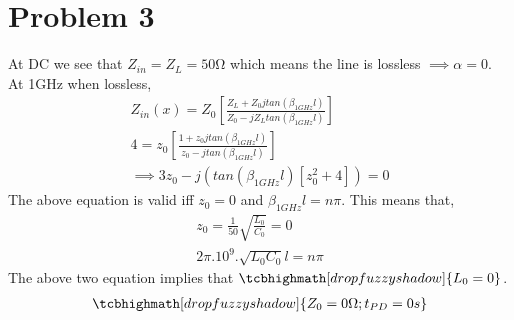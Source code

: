 \documentclass{article}
\begin{document}
\section*{\hfil Problem 3}
At DC we see that $Z_{in} = Z_L = 50 \si{\ohm}$ which means the line is lossless $\implies \alpha = 0$.\\
At 1GHz when lossless,
\begin{gather}
	Z_{in}(x) = Z_0\left[\frac{Z_L + Z_0jtan(\beta _{1GHz}l)}{Z_0 - jZ_Ltan(\beta _{1GHz}l)}\right]\\
	4 = z_0\left[\frac{1 + z_0jtan(\beta _{1GHz}l)}{z_0 - jtan(\beta _{1GHz}l)}\right]\\
	\implies 3z_0 - j\left(tan(\beta _{1GHz}l)[z_0^2 + 4]\right) = 0
\end{gather}
The above equation is valid iff $z_0 = 0$ and $\beta _{1GHz}l = n\pi$. This means that,
\begin{gather}
z_0 = \frac{1}{50}\sqrt{\frac{L_0}{C_0}} = 0\\
2\pi.10^9.\sqrt{L_0C_0}l = n\pi
\end{gather}
The above two equation implies that $\tcbhighmath[drop fuzzy shadow]{L_0 = 0}$.
\begin{gather}
\tcbhighmath[drop fuzzy shadow]{Z_0 = 0 \si{\ohm};
t_{PD} = 0 s}
\end{gather}
\end{document}
